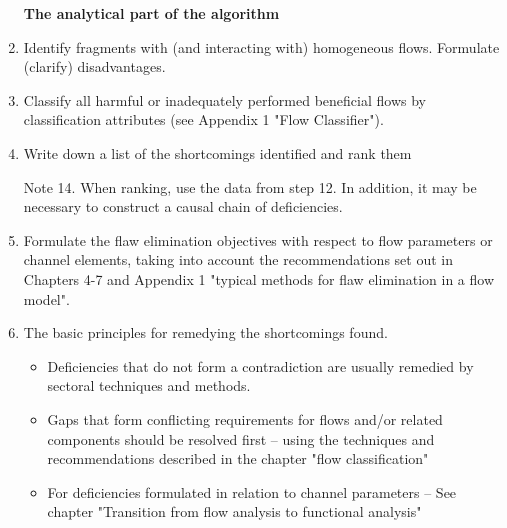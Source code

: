 \documentclass[a4paper,11pt]{article}
\begin{document}
\begin{enumerate}
\textbf{The analytical part of the algorithm}

\item Identify fragments with (and interacting with) homogeneous
  flows. Formulate (clarify) disadvantages.

\item Classify all harmful or inadequately performed beneficial flows by
  classification attributes (see Appendix 1 "Flow Classifier").

\item Write down a list of the shortcomings identified and rank them

  Note 14. When ranking, use the data from step 12. In addition, it may be
  necessary to construct a causal chain of deficiencies.

\item Formulate the flaw elimination objectives with respect to flow
  parameters or channel elements, taking into account the recommendations set
  out in Chapters 4-7 and Appendix 1 "typical methods for flaw elimination in
  a flow model".

\item The basic principles for remedying the shortcomings found.
  \begin{itemize}
  \item Deficiencies that do not form a contradiction are usually remedied by
    sectoral techniques and methods.
  \item Gaps that form conflicting requirements for flows and/or related
    components should be resolved first -- using the techniques and
    recommendations described in the chapter "flow classification"
  \item For deficiencies formulated in relation to channel parameters -- See
    chapter "Transition from flow analysis to functional analysis"
    

\end{itemize}
\end{enumerate}
\end{document}
